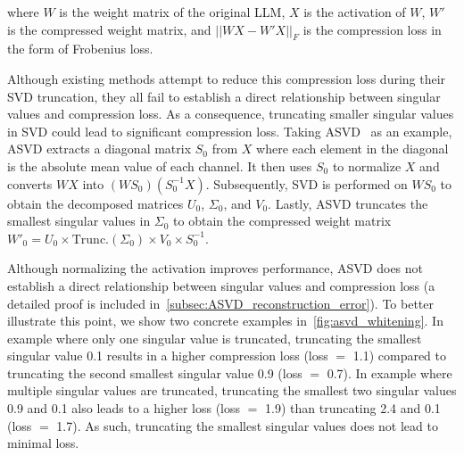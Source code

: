 where $W$ is the weight matrix of the original LLM, $X$ is the activation of $W$, $W'$ is the compressed weight matrix, and $||WX-W'X||_F$ is the compression loss in the form of Frobenius loss.

Although existing methods attempt to reduce this compression loss during their SVD truncation, they all fail to establish a direct relationship between singular values and compression loss. As a consequence, truncating smaller singular values in SVD could lead to significant compression loss. 
%
Taking ASVD~\citep{DBLP:journals/corr/abs-2312-05821} as an example, ASVD extracts a diagonal matrix $S_{0}$ from $X$ where each element in the diagonal is the absolute mean value of each channel.
%
It then uses $S_{0}$ to normalize $X$ and converts $WX$ into $(WS_{0})(S_{0}^{-1}X)$. 
Subsequently, SVD is performed on $WS_{0}$ to obtain the decomposed matrices $U_{0}$, $\Sigma_{0}$, and $V_{0}$. Lastly, ASVD truncates the smallest singular values in $\Sigma_{0}$ to obtain the compressed weight matrix $W'_{0} = U_{0} \times \text{Trunc.}(\Sigma_{0}) \times V_{0} \times S_{0}^{-1}$.

Although normalizing the activation improves performance, ASVD does not establish a direct relationship between singular values and compression loss (a detailed proof is included in~\cref{subsec:ASVD_reconstruction_error}).
%
To better illustrate this point, we show two concrete examples in~\cref{fig:asvd_whitening}. 
%
In example  where only one singular value is truncated, truncating the smallest singular value 0.1 results in a higher compression loss (loss $=$ 1.1) compared to truncating the second smallest singular value 0.9 (loss $=$ 0.7). 
%
In example  where multiple singular values are truncated, truncating the smallest two singular values 0.9 and 0.1 also leads to a higher loss (loss $=$ 1.9) than truncating 2.4 and 0.1 (loss $=$ 1.7).
%
As such, truncating the smallest singular values does not lead to minimal loss.



